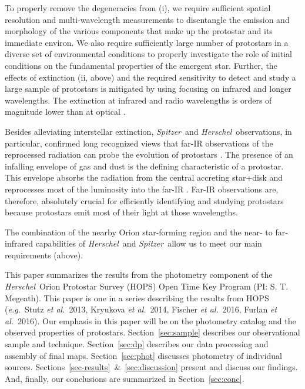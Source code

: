 \documentclass[manuscript]{aastex61}
\newcommand{\etal}{{\em et al.}}
\newcommand{\eg}{{\em e.g.}}
\newcommand{\herschel}{{\em Herschel}}
\newcommand{\spitzer}{{\em Spitzer}}
\begin{document}
To properly remove the degeneracies from (i), we require sufficient spatial resolution and multi-wavelength measurements to disentangle the emission and morphology of the various components that make up the protostar and its immediate environ.  We also require sufficiently large number of protostars in a diverse set of environmental conditions to properly investigate the role of initial conditions on the fundamental properties of the emergent star.  Further, the effects of extinction (ii, above) and the required sensitivity to detect and study a large sample of protostars is mitigated by using focusing on infrared and longer wavelengths.  The extinction at infrared and radio wavelengths is orders of magnitude lower than at optical \citep{extinction}.
\par
Besides alleviating interstellar extinction, \spitzer\ and \herschel\ observations, in particular, confirmed long recognized views that far-IR observations of the reprocessed radiation can probe the evolution of protostars \citep{als87}.  The presence of an infalling envelope of gas and dust is the defining characteristic of a protostar. This envelope absorbs the radiation from the central accreting star+disk and reprocesses most of the luminosity into the far-IR \citep{ali}.   Far-IR observations are, therefore, absolutely crucial for efficiently identifying and studying protostars because protostars emit most of their light at those wavelengths.
\par
The combination of the nearby Orion star-forming region and the near- to far-infrared capabilities of \herschel\ and \spitzer\ allow us to meet our main requirements (above).   
\par
This paper summarizes the results from the photometry component of the \herschel\ Orion Protostar Survey (HOPS) Open Time Key Program (PI: S. T. Megeath).  This paper is one in a series describing the results from HOPS (\eg\ Stutz \etal\ 2013, Kryukova \etal\ 2014, Fischer \etal\ 2016, Furlan \etal\ 2016).  Our emphasis in this paper will be on the photometry catalog and the observed properties of protostars.  Section~\ref{sec:sample} describes our observational sample and technique.  Section~\ref{sec:dp} describes our data processing and assembly of final maps.  Section~\ref{sec:phot} discusses photometry of individual sources.  Sections~\ref{sec-results}~\&~\ref{sec:discussion} present and discuss our findings.  And, finally, our conclusions are summarized in Section~\ref{sec:conc}.
\end{document}
